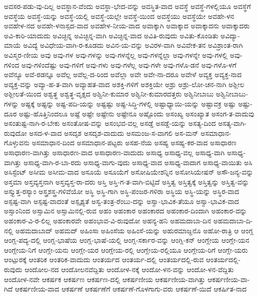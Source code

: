 {ಅವಸರ-ಪಡು-ವು-ದಿಲ್ಲ
ಅವಸ್ಥಾನ-ವೆಂದು
ಅವಸ್ಥಾ-ಭೇದ-ವನ್ನು
ಅವಸ್ಥಿತ-ವಾದ
ಅವಸ್ಥೆ
ಅವಸ್ಥೆ-ಗಳಲ್ಲಿಯೂ
ಅವಸ್ಥೆಗೆ
ಅವಸ್ಥೆಯ
ಅವಸ್ಥೆ-ಯನ್ನು
ಅವಸ್ಥೆ-ಯಲ್ಲಿ
ಅವಸ್ಥೆ-ಯಲ್ಲೇ
ಅವಸ್ಥೆ-ಯಿಂದ
ಅವಸ್ಥೆಯು
ಅವಸ್ಥೆಯೇ
ಅವಹೇ-ಳನ
ಅವಹೇಳ-ನದ
ಅವಹೇ-ಳನಾಸ್ಪದ-ವಾದ
ಅವಹೇಳ-ನೀಯ-ವಾದ
ಅವಾಕ್ಕಾಗಿ
ಅವಾಕ್ಕಾದ
ಅವಾಕ್ಕಾದನು
ಅವಾಕ್ಕಾದರು
ಅವಿ-ಕಾರಿ-ಯಾದುದು
ಅವಿಚ್ಛಿನ್ನ
ಅವಿಚ್ಛಿನ್ನ-ವಾಗಿ
ಅವಿಚ್ಛಿನ್ನ-ವಾದ
ಅವಿತಿ-ರುವುದು
ಅವಿತು-ಕೊಂಡಿತು
ಅವಿದ್ಯಾ-ಮಾಯೆ
ಅವಿದ್ಯೆ
ಅವಿಧೇಯ-ವಾಗಿ-ರ-ಕೂಡದು
ಅವಿನ-ಯ-ವನ್ನು
ಅವಿರಳ-ವಾಗಿ
ಅವಿವೇಕ-ತನ
ಅವಿಶ್ರಾಂತ-ರಾಗಿ
ಅವಿಸ್ಮರ-ಣೀಯ
ಅವು
ಅವು-ಗಳ
ಅವು-ಗಳನ್ನು
ಅವು-ಗಳನ್ನೆಲ್ಲ
ಅವು-ಗಳನ್ನೆಲ್ಲಾ
ಅವು-ಗಳನ್ನೇ
ಅವು-ಗಳಲ್ಲಿ
ಅವು-ಗಳಿಂದ
ಅವು-ಗಳಿಂದೆಷ್ಟು
ಅವು-ಗಳಿಗೆ
ಅವು-ಗಳು
ಅವು-ಗಳೆಲ್ಲ
ಅವು-ಗಳೇ
ಅವು-ಗಳೊ-ಡನೆ
ಅವು-ಗಳೊ-ಳಗೆ
ಅವೆನ್ಯೂ
ಅವೆ-ರಡನ್ನೂ
ಅವೆಲ್ಲ
ಅವೆಲ್ಲ-ದ-ರಿಂದ
ಅವೆಲ್ಲಾ
ಅವೇ
ಅವೇ-ನಾ-ದರೂ
ಅವೇಳೆ
ಅವ್ಯಕ್ತ
ಅವ್ಯಕ್ತ-ನಾದ
ಅವ್ಯಕ್ತ-ವನ್ನು
ಅವ್ಯಾ-ಹ-ತ-ವಾಗಿ
ಅವ್ಯಾಹತ-ವಾದ
ಅಶಕ್ತಿ-ಗಳಿಗೆ
ಅಶಕ್ತಿಯೇ
ಅಶ್ರು
ಅಶ್ರು-ಲೋ-ಚನ-ನಾಗಿ
ಅಶ್ಲೀಲ
ಅಶ್ಲೀಲತೆ-ಯಿಂದ
ಅಶ್ವತ್ಥ
ಅಶ್ವತ್ಥ-ವೃಕ್ಷದ
ಅಶ್ವಿನೀ-ಕುಮಾರ
ಅಶ್ವಿನೀ-ಕುಮಾರದತ್ತರು
ಅಶ್ವಿನೀಬಾಬು
ಅಶ್ವಿನೀಬಾಬು-ಗಳನ್ನು
ಅಷ್ಟಕ್ಕೆ
ಅಷ್ಟನ್ನು
ಅಷ್ಟ-ಪದಿ-ಯನ್ನು
ಅಷ್ಟಷ್ಟು
ಅಷ್ಟ-ಸಿದ್ಧಿ-ಗಳಲ್ಲಿ
ಅಷ್ಟಾಧ್ಯಾಯಿ-ಯನ್ನು
ಅಷ್ಟಾವಕ್ರ
ಅಷ್ಟು
ಅಷ್ಟು-ದೂರ
ಅಷ್ಟು-ಹೊತ್ತಿನಿಂದಲೂ
ಅಷ್ಟೆ
ಅಷ್ಟೇ
ಅಷ್ಟೇನು
ಅಷ್ಟೇನೂ
ಅಷ್ಟೊಂದು
ಅಸಂಖ್ಯ
ಅಸಂಖ್ಯಾತ
ಅಸಂಗ-ತ-ವಾದುವು
ಅಸಂತುಷ್ಟ-ನಾಗಿ-ರ-ಬೇಕು
ಅಸಂತೋಷ-ವನ್ನು
ಅಸಂಭವ-ವಲ್ಲ
ಅಸಡ್ಡೆ
ಅಸಡ್ಡೆ-ಯನ್ನು
ಅಸತ್ಯ-ದಿಂದ
ಅಸತ್ಯ-ವಾಗಿ-ರುವುದೋ
ಅಸದ-ಳ-ವಾದ
ಅಸದೃಶ
ಅಸದೃಶ-ವಾದುದು
ಅಸಮಂಜ-ಸ-ವಾಗಲಿ
ಅಸ-ಮನ್
ಅಸಮಾಧಾನ-ಗೊಳ್ಳುವನು
ಅಸಮಾಧಾನ-ದಿಂದ
ಅಸಮಾಧಾನ-ಪಟ್ಟರು
ಅಸಹ-ನೆಯ
ಅಸಹ್ಯ
ಅಸಹ್ಯ-ಕರ-ವಾದ
ಅಸಾಧಾರಣ
ಅಸಾಧಾರಣ-ವಾಗಿತ್ತು
ಅಸಾಧಾರಣ-ವಾದ
ಅಸಾಧಾರಣ-ವಾದುದು
ಅಸಾಧ್ಯ
ಅಸಾಧ್ಯ-ವಲ್ಲ
ಅಸಾಧ್ಯ-ವಾಗಿ
ಅಸಾಧ್ಯ-ವಾಗಿತ್ತು
ಅಸಾಧ್ಯ-ವಾಗಿ-ರ-ಬಾ-ರದು
ಅಸಾಧ್ಯ-ವಾಗು-ವುದು
ಅಸಾಧ್ಯ-ವಾದ
ಅಸಾಧ್ಯ-ವಾದಾಗ
ಅಸಾಧ್ಯ-ವಾಯಿತು
ಅಸಿ
ಅಸಿಸ್ಟೆಂಟ್
ಅಸೀಮ
ಅಸೀಮ-ವಾದ
ಅಸೂಯೆ
ಅಸೂಯೆಗೆ
ಅಸೋಷಿಯೇಶನ್ನಿನ
ಅಸೋಸಿಯೇಷನ್
ಅಸೌ-ಜನ್ಯ-ವನ್ನು
ಅಸ್ತಮಾ
ಅಸ್ತವ್ಯಸ್ತನಾಗಿ
ಅಸ್ತವ್ಯಸ್ತ-ರಾ-ದರು
ಅಸ್ತಿ
ಅಸ್ತಿ-ಗ-ತ-ವಾಗಿ-ಬಿಟ್ಟಿದೆ
ಅಸ್ತಿತ್ವ
ಅಸ್ತಿತ್ವಕ್ಕೆ
ಅಸ್ತಿತ್ವನ್ನು
ಅಸ್ತಿತ್ವ-ವನ್ನು
ಅಸ್ತ್ಯುತ್ತ-ರಸ್ಯಾಂ
ಅಸ್ತ್ರಶಸ್ತ್ರ-ಗಳಿವೆಯೋ
ಅಸ್ಥಿ
ಅಸ್ಥಿ-ಗಾಗಿ
ಅಸ್ಥಿ-ಪಂಜರ-ಗಳಿರಾ
ಅಸ್ಥಿಯ
ಅಸ್ಥಿ-ಯನ್ನು
ಅಸ್ಥಿರ-ವಾದ
ಅಸ್ಪಷ್ಟ-ವಾಗಿ
ಅಸ್ಪಷ್ಟ-ವಾದಂತೆ
ಅಸ್ಪೃಶ್ಯತೆ
ಅಸ್ವ-ತಂತ್ರ-ರೆಂಬು-ದನ್ನು
ಅಸ್ವಾ-ಭಾವಿಕ-ತೆಯೂ
ಅಸ್ವಾ-ಭಾವಿಕ-ವಾದ
ಅಸ್ಸಾಂನಿಂದ
ಅಸ್ಸಾಮಿನ
ಅಸ್ಸಾಮಿನಲ್ಲಿ-ರುವ
ಅಹಂ
ಅಹಂಕಾರ
ಅಹಂಕಾರದ
ಅಹಂಕಾರ-ದಿಂದಾಗಿ
ಅಹಂಕಾರ-ವನ್ನು
ಅಹಂಕಾರ-ವಿ-ರ-ಲಿಲ್ಲ
ಅಹಂಕಾರವೇ
ಅಹಂಭಾವ-ವಿ-ರುವುದೋ
ಅಹನ್ಯ-ಹನಿ
ಅಹಮದಾಬಾ-ದಿನ
ಅಹಮದಾಬಾ-ದಿ-ನಲ್ಲಿ
ಅಹಮದಾಬಾದ್
ಅಹಮದ್
ಅಹಿಂಸಾ
ಅಹಿಂಸೆಯ
ಅಹಿಂಸೆ-ಯನ್ನು
ಅಹುರಮಾಜ್ದನೊ
ಅಹೋ-ರಾತ್ರಿ
ಆ
ಆಂಗ್ಲ
ಆಂಗ್ಲ-ಪದ್ಯ-ದಲ್ಲಿ
ಆಂಗ್ಲ-ಭಾಷೆಯ
ಆಂಗ್ಲ-ಭಾಷೆ-ಯಲ್ಲಿ
ಆಂಗ್ಲ-ಸರ್ಕಾರ-ವನ್ನು
ಆಂಗ್ಲಿ-ಕನ್
ಆಂಗ್ಲೇಯ
ಆಂಗ್ಲೇ-ಯನ
ಆಂಗ್ಲೇಯ-ನಿಗೆ
ಆಂಗ್ಲೇ-ಯನು
ಆಂಗ್ಲೇ-ಯರ
ಆಂಗ್ಲೇಯ-ರಲ್ಲಿ
ಆಂಗ್ಲೇಯ-ರಲ್ಲಿಯೂ
ಆಂಗ್ಲೇಯ-ರಿಗೆ
ಆಂಗ್ಲೇ-ಯರು
ಆಂಟ್ಪುರಕ್ಕೆ
ಆಂತರಿಕ
ಆಂತರಿಕ-ವಾದುದು
ಆಂತರ್ಯದ
ಆಂತರ್ಯ-ದಲ್ಲಿ
ಆಂತರ್ಯದಲ್ಲಿ-ರುವ
ಆಂತರ್ಯದಲ್ಲಿ-ರುವುದು
ಆಂದೋಲ-ನದ
ಆಂದೋಲನವೆದ್ದಿತು
ಆಂದೋಳ-ನಕ್ಕೆ
ಆಂದೋ-ಳನ-ವನ್ನು
ಆಂದೋ-ಳನ-ವೆದ್ದಿತು
ಆಂದೋಳ-ನವೇ
ಆಕರ್ಷಕ
ಆಕರ್ಷಣ
ಆಕರ್ಷಣ-ದಲ್ಲಿ
ಆಕರ್ಷಣೀಯ
ಆಕರ್ಷಣೀಯ-ವಾಗಿತ್ತು
ಆಕರ್ಷಣೀಯ-ವಾ-ಗಿದೆ
ಆಕರ್ಷಣೀಯ-ವಾದ
ಆಕರ್ಷಣೆ
ಆಕರ್ಷಣೆಗೆ
ಆಕರ್ಷಣೆ-ಗೊಳಗಾಗು-ವರು
ಆಕರ್ಷಣೆ-ಯಿದೆ
ಆಕರ್ಷಿತ-ನಾದ
}
